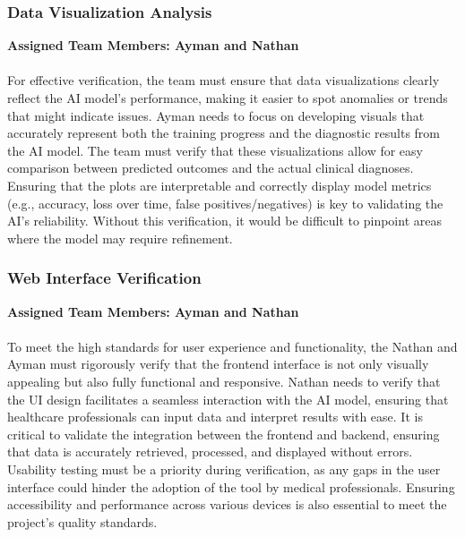 \documentclass[12pt, titlepage]{article}
\begin{document}
\subsubsection{Data Visualization Analysis}
\textbf{Assigned Team Members: Ayman and Nathan}\\\\ 
For effective verification, the team must ensure that data visualizations clearly reflect the AI model's performance, making it easier to spot anomalies or trends that might indicate issues. Ayman needs to focus on developing visuals that accurately represent both the training progress and the diagnostic results from the AI model. The team must verify that these visualizations allow for easy comparison between predicted outcomes and the actual clinical diagnoses. Ensuring that the plots are interpretable and correctly display model metrics (e.g., accuracy, loss over time, false positives/negatives) is key to validating the AI's reliability. Without this verification, it would be difficult to pinpoint areas where the model may require refinement.


\subsubsection{Web Interface Verification}
\textbf{Assigned Team Members: Ayman and Nathan} \\\\
To meet the high standards for user experience and functionality, the Nathan and Ayman must rigorously verify that the frontend interface is not only visually appealing but also fully functional and responsive. Nathan needs to verify that the UI design facilitates a seamless interaction with the AI model, ensuring that healthcare professionals can input data and interpret results with ease. It is critical to validate the integration between the frontend and backend, ensuring that data is accurately retrieved, processed, and displayed without errors. Usability testing must be a priority during verification, as any gaps in the user interface could hinder the adoption of the tool by medical professionals. Ensuring accessibility and performance across various devices is also essential to meet the project's quality standards.
\end{document}
